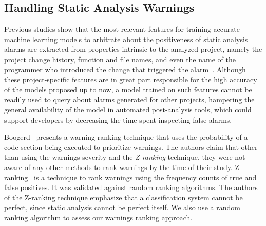 


\subsection{Handling Static Analysis Warnings}
\label{sub:related_work}

Previous studies show that the most relevant features for training accurate
machine learning models to arbitrate about the positiveness of static analysis
alarms are extracted from properties intrinsic to the analyzed project,
namely the project change history, function and file names, and even the name
of the programmer who introduced the change that triggered the
alarm~\cite{kremenek2004correlation, heckman2009model, jung2005taming,
ruthruff_predicting_2008, yoon2014reducing}. Although these project-specific
features are in great part responsible for the high accuracy of the models
proposed up to now, a model trained on such features cannot be readily used to
query about alarms generated for other projects, hampering the general
availability of the model in automated post-analysis tools, which could
support developers by decreasing the time spent inspecting false alarms.

Boogerd~\cite{boogerd2006prioritizing} presents a warning ranking technique
that uses the probability of a code section being executed to prioritize
warnings. The authors claim that other than using the warnings severity and the
\textit{Z-ranking} technique, they were not aware of any other methods to rank
warnings by the time of their study. Z-ranking~\cite{kremenek2003z} is a
technique to rank warnings using the frequency counts of true and false
positives. It was validated against random ranking algorithms. The
authors of the Z-ranking technique emphasize that a classification system
cannot be perfect, since static analysis cannot be perfect itself.
We also use a random ranking algorithm to assess our warnings ranking approach.

